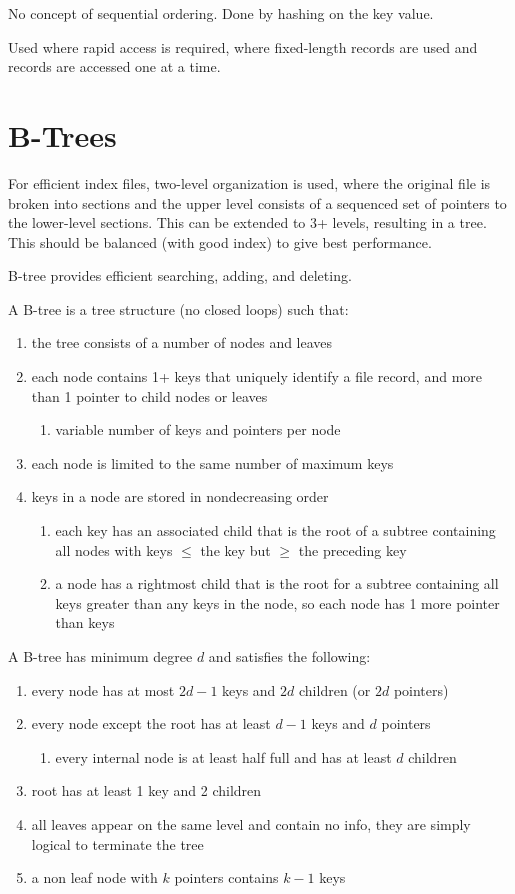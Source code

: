 \documentclass[11pt]{article}
\begin{document}
No concept of sequential ordering.
Done by hashing on the key value.

Used where rapid access is required, where fixed-length records are used and records are accessed
one at a time.
\section{B-Trees}
\label{sec:org1ccd1ce}
For efficient index files, two-level organization is used, where the original file is broken into sections
and the upper level consists of a sequenced set of pointers to the lower-level sections.
This can be extended to 3+ levels, resulting in a tree.
This should be balanced (with good index) to give best performance.

B-tree provides efficient searching, adding, and deleting.

A B-tree is a tree structure (no closed loops) such that:
\begin{enumerate}
\item the tree consists of a number of nodes and leaves
\item each node contains 1+ keys that uniquely identify a file record, and more than 1 pointer to child
nodes or leaves
\begin{enumerate}
\item variable number of keys and pointers per node
\end{enumerate}
\item each node is limited to the same number of maximum keys
\item keys in a node are stored in nondecreasing order
\begin{enumerate}
\item each key has an associated child that is the root of a subtree containing all nodes with keys
\(\le\) the key but \(\ge\) the preceding key
\item a node has a rightmost child that is the root for a subtree containing all keys greater than
any keys in the node, so each node has 1 more pointer than keys
\end{enumerate}
\end{enumerate}

A B-tree has minimum degree \(d\) and satisfies the following:
\begin{enumerate}
\item every node has at most \(2d-1\) keys and \(2d\) children (or \(2d\) pointers)
\item every node except the root has at least \(d-1\) keys and \(d\) pointers
\begin{enumerate}
\item every internal node is at least half full and has at least \(d\) children
\end{enumerate}
\item root has at least 1 key and 2 children
\item all leaves appear on the same level and contain no info, they are simply logical to terminate the tree
\item a non leaf node with \(k\) pointers contains \(k-1\) keys
\end{enumerate}
\end{document}
